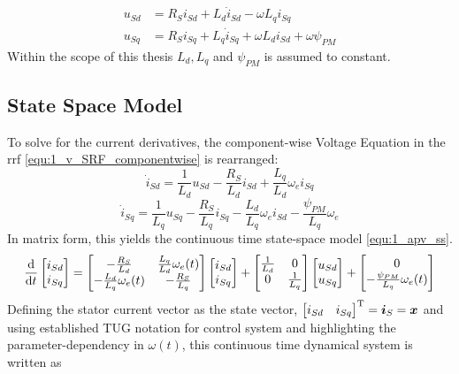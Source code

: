 \begin{equation}
    \begin{split}
        u_{Sd}
        &=
        R_S i_{Sd}
        +
        L_d\dot{i}_{Sd}
        -
        \omega L_q i_{Sq}\\
        u_{Sq}
        &=
        R_S i_{Sq}
        +
        L_q\dot{i}_{Sq}
        +
        \omega L_d i_{Sd}
        +
        \omega\psi_{PM}
    \end{split}
    \label{equ:1_v_SRF_componentwise}
\end{equation}
Within the scope of this thesis $L_d, L_q$ and $\psi_{PM}$ is assumed to constant.


\subsection{State Space Model} \label{sec:1_pmsm_ss}
To solve for the current derivatives, the component-wise Voltage Equation in the \acrshort{rrf} \eqref{equ:1_v_SRF_componentwise} is rearranged:
\[
\dot{i}_{Sd} = \frac{1}{L_d}u_{Sd} - \frac{R_S}{L_d} i_{Sd} + \frac{L_q}{L_d}\omega_e i_{Sq}
\]
\[ 
\dot{i}_{Sq} = \frac{1}{L_q}u_{Sq} - \frac{R_S}{L_q} i_{Sq} - \frac{L_d}{L_q}\omega_e i_{Sd} - \frac{\psi_{PM}}{L_q}\omega_e \]
In matrix form, this yields the continuous time state-space model \eqref{equ:1_apv_ss}.
\begin{equation}
	\dfrac{\mathrm{d}}{\mathrm{d} t} \begin{bmatrix}
		i_{Sd} \\i_{Sq}
	\end{bmatrix}
	= \begin{bmatrix}
		-\frac{R_S}{L_d} & \frac{L_q}{L_d} \omega_e(t)\\ -\frac{L_d}{L_q} \omega_e(t) & -\frac{R_S}{L_q}
	\end{bmatrix}\begin{bmatrix}
		i_{Sd} \\i_{Sq}
	\end{bmatrix} + 
	\begin{bmatrix}
		\frac{1}{L_d} & 0 \\ 0 & \frac{1}{L_q}
	\end{bmatrix}\begin{bmatrix}
		u_{Sd} \\u_{Sq}
	\end{bmatrix} + \begin{bmatrix}
		0 \\ - \frac{\psi_{PM}}{L_q} \omega_e(t)
	\end{bmatrix}
	\label{equ:1_apv_ss}
\end{equation}
Defining the stator current vector as the state vector, $\begin{bmatrix}
		i_{Sd}  & i_{Sq}
	\end{bmatrix}^{\mathrm{T}} 
    = \bm{i}_S = {\bm x} $ 
and using established TUG notation for control system and highlighting the parameter-dependency in $\omega(t)$, this continuous time dynamical system is written as


